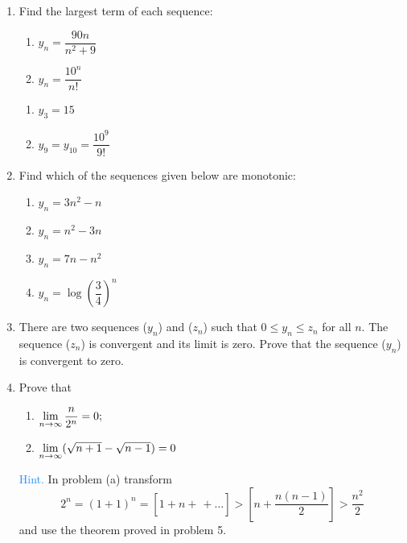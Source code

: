 \begin{enumerate}[label=\textcolor{IndianRed}{Problem \arabic*},leftmargin=2cm]
\item Find the largest term of each sequence:
\begin{enumerate}[label=(\alph*)]
\item $y_{n} = \dfrac{90n}{n^{2} + 9} $
\item $y_{n} = \dfrac{10^{n}}{n!}$ 
\end{enumerate}

\Answer
\begin{enumerate}[label=(\alph*)]
\item $  y_{3}= 15$
\item $ y_{9} = y_{10} = \dfrac{10^{9}}{9!} $
\end{enumerate}

\item Find which of the sequences given below are monotonic:
\begin{enumerate}[label=(\alph*)]
\item $y_{n} = 3n^{2} - n$
\item $y_{n} = n^{2} - 3n $
\item $y_{n} = 7n - n^{2} $
\item $y_{n} =  \log \left( \dfrac{3}{4} \right)^{n}$
\end{enumerate}

\Answer
{}

\item There are two sequences ($y_{n}$) and ($z_{n}$) such that $0 \leqslant y_{n} \leqslant z_{n}$ for all $n$. The sequence ($z_{n}$) is convergent and its limit is zero. Prove that the sequence ($y_{n}$) is convergent to zero. 

\item Prove that
\begin{enumerate}[label=(\alph*)]
\item $ \lim\limits_{n \to \infty} \dfrac{n}{2^{n}} =0;$
\item $ \lim\limits_{n \to \infty} (\sqrt{n+1} - \sqrt{n -1}) =0 $
\end{enumerate}

\textcolor{DodgerBlue}{Hint.} In problem (a) transform	
\begin{equation*}%
2^{n}= (1+1)^{n} = \left[ 1 + n + \dfrac{}{} + \ldots \right] > \left[ n + \dfrac{n(n- 1)}{2} \right] > \dfrac{n^{2}}{2}
\end{equation*}
and use the theorem proved in problem 5.


\end{enumerate}
